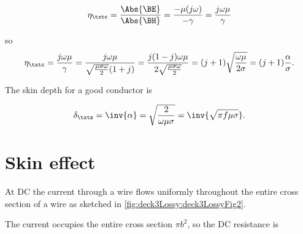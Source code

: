 \begin{dmath}\label{eqn:uwavesLecture3:480}
\eta_\txtc = \frac{\Abs{\BE}}{\Abs{\BH}} = \frac{- \mu (j \omega)}{-\gamma} = \frac{j \omega \mu}{\gamma}
\end{dmath}

so
\begin{dmath}\label{eqn:uwavesLecture3:460}
\eta_\txtc 
=
\frac{j \omega \mu}{ \gamma}
=
\frac{j \omega \mu}{ 
\sqrt{ \frac{ \mu \sigma \omega}{2 } } ( 1 + j )
}
=
\frac{j (1 - j ) \omega \mu}{ 
2 \sqrt{ \frac{ \mu \sigma \omega}{2 } } 
}
=
(j + 1) \sqrt{ \frac{ \omega \mu }{ 2 \sigma} }
=
(j + 1) \frac{\alpha}{\sigma}.
\end{dmath}

The skin depth for a good conductor is

\begin{dmath}\label{eqn:uwavesLecture3:500}
\delta_\txts = \inv{\alpha} = \sqrt{\frac{2}{ \omega \mu \sigma } } = \inv{\sqrt{\pi f \mu \sigma}}.
\end{dmath}


\section{Skin effect}

At DC the current through a wire flows uniformly throughout the entire cross section of a wire as sketched in \cref{fig:deck3Lossy:deck3LossyFig2}.


The current occupies the entire cross section \( \pi b^2 \), so the DC resistance is


